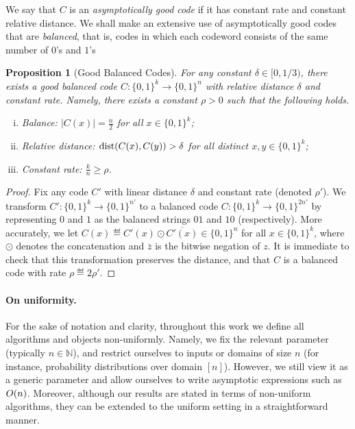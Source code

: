 \documentclass[11pt]{article}
\newtheorem{proposition}[prop]{Proposition}
\theoremstyle{remark}   	\newtheorem{remark}[theorem]{Remark}
\theoremstyle{definition}   	\newaliascnt{defn}{theorem}
\newcommand{\bigO}[1]{{O\mleft( #1 \mright)}}
\newcommand{\distop}{\operatorname{dist}}
\newcommand{\dist}[2]{\distop\mleft({#1, #2}\mright)}
\newcommand{\abs}[1]{\left\lvert #1 \right\rvert}
\newcommand{\N}{\ensuremath{\mathbb{N}}\xspace}
\newcommand{\bitset}{\ensuremath{\{0,1\}}}
\begin{document}
We say that $C$ is an \emph{asymptotically good code} if it has constant rate and constant relative distance. We shall make an extensive use of asymptotically good codes that are \emph{balanced}, that is, codes in which each codeword consists of the same number of $0$'s and $1$'s

\begin{proposition}[Good Balanced Codes]\label{lemma:good:balanced:hamming:codes}
  For any constant $\delta \in [0,1/3)$, there exists a good balanced code $C\colon \bitset^k \to \bitset^n$ with relative distance $\delta$ and constant rate. Namely, there exists a constant $\rho>0$ such that the following holds.
  \begin{enumerate}[(i)]
    \item Balance: $\abs{C(x)} = \frac{n}{2}$ for all $x\in \bitset^k$;
    \item Relative distance: $\dist{C(x)}{C(y)} > \delta$ for all distinct $x,y\in \bitset^k$;
    \item Constant rate: $\frac{k}{n} \geq \rho$.
  \end{enumerate}
\end{proposition}
\begin{proof}
  Fix any code $C'$ with linear distance $\delta$ and constant rate (denoted $\rho'$). We transform $C'\colon \bitset^k \to \bitset^{n'}$ to a balanced code $C\colon \bitset^k \to \bitset^{2n'}$ by representing $0$ and $1$ as the balanced strings $01$ and $10$ (respectively). More accurately, we let $C(x) \eqdef C'(x)\odot\overline{C'(x)}\in\bitset^n$ for all $x\in\bitset^k$, where  $\odot$ denotes the concatenation and $\bar{z}$ is the bitwise negation of $z$. It is immediate to check that this transformation preserves the distance, and that $C$ is a balanced code with rate $\rho\eqdef 2\rho'$.
\end{proof}

\paragraph{On uniformity.} For the sake of notation and clarity, throughout this work we define all algorithms and objects non-uniformly. Namely, we fix the relevant parameter (typically $n\in\N$), and restrict ourselves to inputs or domains of size $n$ (for instance, probability distributions over domain $[n]$). However, we still view it as a generic parameter and allow ourselves to write asymptotic expressions such as $\bigO{n}$. Moreover, although our results are stated in terms of non-uniform algorithms, they can be extended to the uniform setting in a straightforward manner.
 
\end{document}
